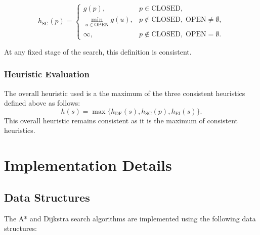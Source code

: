 \documentclass[11pt]{article}
\begin{document}
\[
  h_{\mathrm{SC}}(p)=
  \begin{cases}
    g(p),   & p\in\mathrm{CLOSED},                                 \\
    \displaystyle\min_{u\in\mathrm{OPEN}}g(u),
            & p\notin\mathrm{CLOSED},\;\mathrm{OPEN}\neq\emptyset, \\
    \infty, & p\notin\mathrm{CLOSED},\;\mathrm{OPEN}=\emptyset.
  \end{cases}
\]

At any fixed stage of the search, this definition is consistent.

\subsubsection{Heuristic Evaluation}
The overall heuristic used is a the maximum of the three consistent heuristics defined above as follows:
\[
  h(s) = \max\{h_{\mathrm{DF}}(s), h_{\mathrm{SC}}(p), h_{\mathrm{EI}}(s)\}.
\]
This overall heuristic remains consistent as it is the maximum of consistent heuristics.

\section{Implementation Details}

\subsection{Data Structures}

The A* and Dijkstra search algorithms are implemented using the following data structures:
\end{document}
